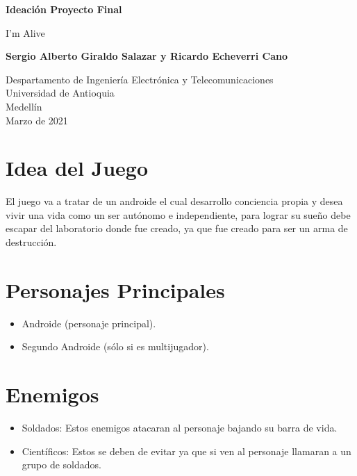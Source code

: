 \documentclass{article}
\begin{document}
\begin{titlepage}
    \begin{center}
        \vspace*{1cm}
            
        \Huge
        \textbf{Ideación Proyecto Final}

        \vspace{0.5cm}
        \LARGE
        I'm Alive
            
        \vspace{1.5cm}
            
        \textbf{Sergio Alberto Giraldo Salazar y Ricardo Echeverri Cano}
            
        \vfill
            
        \vspace{0.8cm}
            
        \Large
        Despartamento de Ingeniería Electrónica y Telecomunicaciones\\
        Universidad de Antioquia\\
        Medellín\\
        Marzo de 2021
            
    \end{center}
\end{titlepage}

\tableofcontents
\newpage
\section{Idea del Juego}\label{idea}
El juego va a tratar de un androide el cual desarrollo conciencia propia y desea vivir una vida como un ser autónomo e independiente, para lograr su sueño debe escapar del laboratorio donde fue creado, ya que fue creado para ser un arma de destrucción.
\cite{Alaluzdeunabombilla}

\section{Personajes Principales} \label{personajes}
\begin{itemize}
    \item Androide (personaje principal).
    \item Segundo Androide (sólo si es multijugador).
\end{itemize}

\section{Enemigos}\label{enemigos}
\begin{itemize}
    \item Soldados: Estos enemigos atacaran al personaje bajando su barra de vida.
    \item Científicos: Estos se deben de evitar ya que si ven al personaje llamaran a un grupo de soldados.
\end{itemize}
\end{document}
